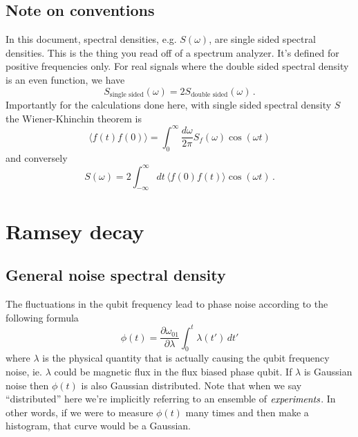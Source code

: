 \documentclass{article}
\begin{document}
\subsection{Note on conventions}

In this document, spectral densities, e.g. $S(\omega)$, are single sided spectral densities.
This is the thing you read off of a spectrum analyzer.
It's defined for positive frequencies only.
For real signals where the double sided spectral density is an even function, we have
\begin{equation}
S_{\text{single sided}}(\omega) = 2 S_{\text{double sided}}(\omega) \, .
\end{equation}
Importantly for the calculations done here, with single sided spectral density $S$ the Wiener-Khinchin theorem is
\begin{equation}
\langle f(t) f(0) \rangle = \int_0^\infty \frac{d\omega}{2\pi} S_f(\omega) \cos(\omega t)
\end{equation}
and conversely
\begin{equation}
S(\omega) = 2 \int_{-\infty}^\infty dt \, \langle f(0) f(t) \rangle \cos(\omega t) \, . 
\end{equation}


\section{Ramsey decay}

\subsection{General noise spectral density}

The fluctuations in the qubit frequency lead to phase noise according to the following formula
\begin{equation}
\phi(t)=\frac{\partial\omega_{01}}{\partial\lambda}\int_0^t\lambda(t')\, dt'
\end{equation}
where $\lambda$ is the physical quantity that is actually causing the qubit frequency noise, ie. $\lambda$ could be magnetic flux in the flux biased phase qubit.
If $\lambda$ is Gaussian noise then $\phi(t)$ is also Gaussian distributed.
Note that when we say ``distributed'' here we're implicitly referring to an ensemble of $\emph{experiments}$.
In other words, if we were to measure $\phi(t)$ many times and then make a histogram, that curve would be a Gaussian.
\end{document}
